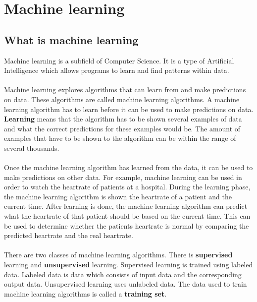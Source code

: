 
\chapter{Machine learning} %

\label{Chapter2} %

\section{What is machine learning}
Machine learning is a subfield of Computer Science. It is a type of Artificial Intelligence which allows programs to learn and find patterns within data. \cite{coursera} \\
\\
Machine learning explores algorithms that can learn from and make predictions on data. These algorithms are called machine learning algorithms. A machine learning algorithm has to learn before it can be used to make predictions on data. \textbf{Learning} means that the algorithm has to be shown several examples of data and what the correct predictions for these examples would be. The amount of examples that have to be shown to the algorithm can be within the range of several thousands. \\
\\
Once the machine learning algorithm has learned from the data, it can be used to make predictions on other data. For example, machine learning can be used in order to watch the heartrate of patients at a hospital. During the learning phase, the machine learning algorithm is shown the heartrate of a patient and  the current time. After learning is done, the machine learning algorithm can predict what the heartrate of that patient should be based on the current time. This can be used to determine whether the patients heartrate is normal by comparing the predicted heartrate and the real heartrate.\\
\\
There are two classes of machine learning algorithms. There is \textbf{supervised} learning and \textbf{unsupervised} learning. Supervised learning is trained using labeled data. Labeled data is data which consists of input data and the corresponding output data. Unsupervised learning uses unlabeled data. The data used to train machine learning algorithms is called a \textbf{training set}.\\
